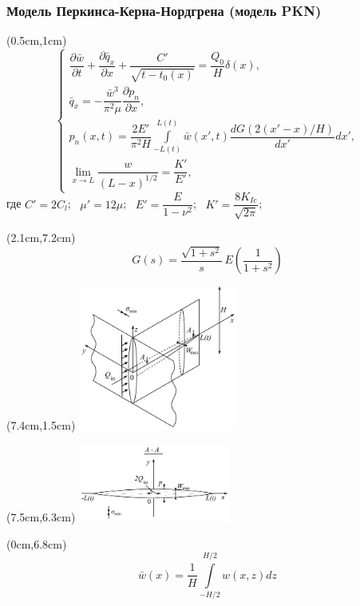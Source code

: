 \documentclass{beamer}
\begin{document}
\begin{frame}
\frametitle{Модель Перкинса-Керна-Нордгрена (модель PKN)}

\scriptsize

\begin{textblock*}{7cm}(0.5cm,1cm)
$$
\begin{cases}
\dfrac{\partial\bar{w}}{\partial t}+\dfrac{\partial\bar{q}_x}{\partial x}+\dfrac{C'}{\sqrt{t-t_0(x)}}=\dfrac{Q_0}{H}\delta(x),\\[15pt]
\bar{q}_x=-\dfrac{\bar{w}^3}{\pi^2\mu}\dfrac{\partial p_n}{\partial x},\\[15pt]
p_n(x,t)=\dfrac{2E'}{\pi^2H}\displaystyle\int\limits_{-L(t)}^{L(t)}\bar{w}(x',t)\dfrac{dG(2(x'-x)/H)}{dx'}dx',\\[22pt]
\displaystyle\lim_{x\to L}\dfrac{w}{(L-x)^{1/2}}=\dfrac{K'}{E'},
\end{cases}
$$
где $C'=2C_l$; $\,\,\,\mu'=12\mu$; $\,\,\,E'=\dfrac{E}{1-\nu^2}$; $\,\,\,K'=\dfrac{8K_{Ic}}{\sqrt{2\pi}}$;
\end{textblock*}

\begin{textblock*}{7cm}(2.1cm,7.2cm)
$$
G(s)=\frac{\sqrt{1+s^2}}{s}\,E\!\left(\frac{1}{1+s^2}\right)
$$
\end{textblock*}

\begin{textblock*}{7cm}(7.4cm,1.5cm)
\includegraphics[width=5.2cm]{pkn_model_3D.jpg}
\end{textblock*}

\begin{textblock*}{7cm}(7.5cm,6.3cm)
\includegraphics[width=5cm]{pkn_model_A-A_plane.jpg}
\end{textblock*}

\begin{textblock*}{3.7cm}(0cm,6.8cm)
\tiny
$$
\boxed{
\bar{w}(x)=\frac{1}{H}\!\int\limits_{-H/2}^{H/2}{w(x,z)dz}
}
$$
\end{textblock*}


\end{frame}
\end{document}
